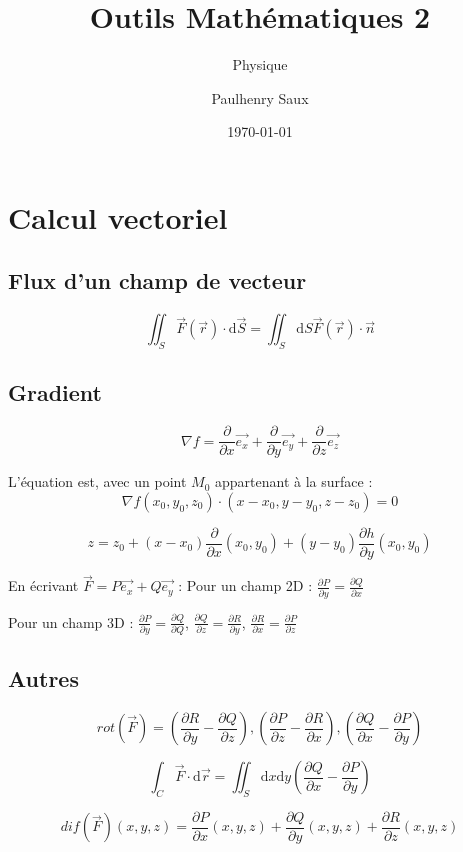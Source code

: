 \documentclass[french]{yLectureNote}
\title{Outils Mathématiques 2}
\subtitle{Physique}
\author{Paulhenry Saux}
\date{\today}
\renewcommand{\vec}{\overrightarrow}
\newcommand{\dd}{\mathrm{d}}
\begin{document}
\setcounter{chapter}{2}
\chapter{Calcul vectoriel}
\section{Flux d'un champ de vecteur}
\begin{definition}
\[\iint_S \vec{F}(\vec{r})\cdot \dd \vec{S} = \iint_S \dd S \vec{F}(\vec{r})\cdot \vec{n}\]
\end{definition}
\section{Gradient}
\begin{definition}[Gradient]
\[\nabla f = \frac{\partial }{\partial x}\vec{e_x}+\frac{\partial }{\partial y}\vec{e_y}+\frac{\partial }{\partial z}\vec{e_z}\]
\end{definition}
\begin{theorem}
L'équation est, avec un point \(M_0\) appartenant  à la surface : \[\nabla f(x_0,y_0,z_0)\cdot (x-x_0, y-y_0,z-z_0) = 0\]
\end{theorem}
\begin{theorem}[Plan tangent à une surface de la forme \(z = h(x,y)\)]
\[z=z_0+(x-x_0)\frac{\partial}{\partial x}(x_0,y_0)+(y-y_0)\frac{\partial h}{\partial y}(x_0,y_0)\]
\end{theorem}

\begin{theorem}
En écrivant \(\vec{F} = P\vec{e_x}+ Q\vec{e_y}\) :
Pour un champ 2D : \(\frac{\partial P}{\partial y} = \frac{\partial Q}{\partial x}\)

Pour un champ 3D : \(\frac{\partial P}{\partial y} = \frac{\partial Q}{\partial Q}\),  \(\frac{\partial Q}{\partial z} = \frac{\partial R}{\partial y}\), \(\frac{\partial R}{\partial x} = \frac{\partial P}{\partial z}\)
\end{theorem}
\section{Autres}
\begin{definition}[Rotationnel]
\[rot(\vec{F}) = (\frac{\partial R}{\partial y}-\frac{\partial Q}{\partial z}),  (\frac{\partial P}{\partial z}-\frac{\partial R}{\partial x}),  (\frac{\partial Q}{\partial x}-\frac{\partial P}{\partial y})\]
\end{definition}
\begin{theorem}
 \[\int_C \vec{F}\cdot \dd \vec{r} = \iint_S \dd x\dd y (\frac{\partial Q}{\partial x}-\frac{\partial P}{\partial y})\]
\end{theorem}
\begin{definition}[Divergent]
\[dif(\vec{F})(x,y,z) = \frac{\partial P}{\partial x}(x,y,z) + \frac{\partial Q}{\partial y}(x,y,z) + \frac{\partial R}{\partial z}(x,y,z)\]
\end{definition}
\end{document}

